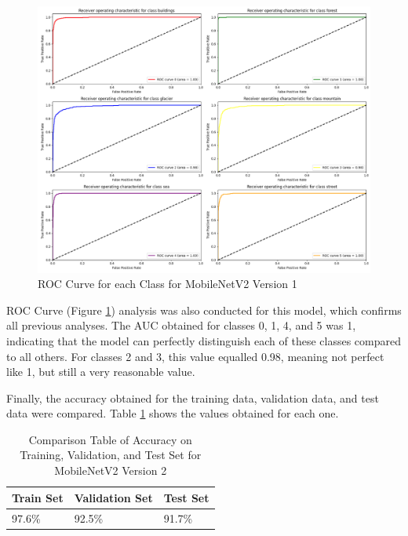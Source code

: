 \documentclass[conference]{IEEEtran}
\begin{document}
\begin{figure}[H]
    \centering
    \includegraphics[width=1\linewidth]{images/rocMobileNetV2_2.png}
    \caption{ROC Curve for each Class for MobileNetV2 Version 1}
    \label{fig:rocMobileNetV2_2}
\end{figure}

ROC Curve (Figure \ref{fig:rocMobileNetV2_2}) analysis was also conducted for this model, which confirms all previous analyses. The AUC obtained for classes 0, 1, 4, and 5 was 1, indicating that the model can perfectly distinguish each of these classes compared to all others. For classes 2 and 3, this value equalled 0.98, meaning not perfect like 1, but still a very reasonable value.

Finally, the accuracy obtained for the training data, validation data, and test data were compared. Table \ref{tab:accMobileNetV2_2} shows the values obtained for each one.

\begin{table}[H]
    \centering
    \caption{Comparison Table of Accuracy on Training, Validation, and Test Set for MobileNetV2 Version 2}
    \renewcommand{\arraystretch}{1.5}
    \begin{tabularx}{0.8\linewidth}{|X|X|X|}
    \hline
    \cellcolor[HTML]{EFEFEF}\textbf{Train Set} & \cellcolor[HTML]{EFEFEF}\textbf{Validation Set} & \cellcolor[HTML]{EFEFEF}\textbf{Test Set} \\ \hline
     97.6\%  & 92.5\%  & 91.7\%\\ \hline
    \end{tabularx}
    \label{tab:accMobileNetV2_2}
\end{table}
\end{document}
